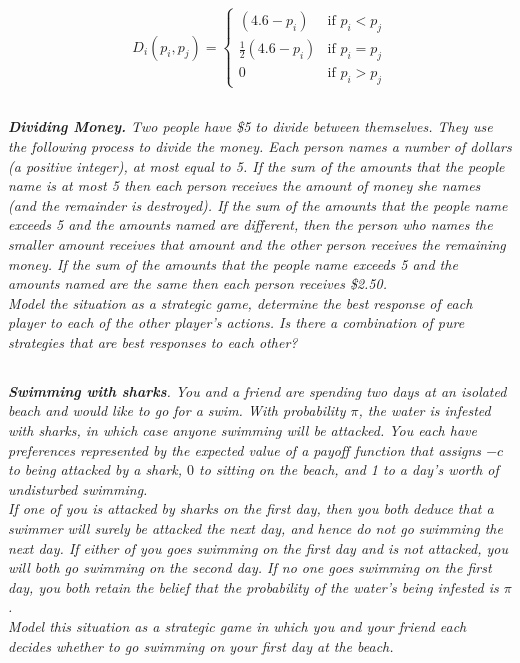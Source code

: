 \documentclass[12pt]{amsart}
\begin{document}
\[
D_i(p_i,p_j)= \begin{cases}
	(4.6-p_i) & \text{if }p_i<p_j \\
	\frac{1}{2}(4.6-p_i) & \text{if }p_i=p_j \\
	0 & \text{if }p_i>p_j
\end{cases}\]

\subsection{}
\textit{\textbf{Dividing Money.} Two people have \$5 to divide between themselves. They use the
following process to divide the money. Each person names a number of dollars (a positive
integer), at most equal to 5. If the sum of the amounts that the people name is at most 5
then each person receives the amount of money she names (and the remainder is
destroyed). If the sum of the amounts that the people name exceeds 5 and the amounts
named are different, then the person who names the smaller amount receives that amount
and the other person receives the remaining money. If the sum of the amounts that the
people name exceeds 5 and the amounts named are the same then each person receives
\$2.50. \\
Model the situation as a strategic game, determine the best response of each player to each
of the other player’s actions. Is there a combination of pure strategies that are best
responses to each other?}

\subsection{}
\textit{\textbf{Swimming with sharks}. You and a friend are spending two days at an isolated beach and
	would like to go for a swim. With probability $\pi$, the water is infested with sharks, in which
	case anyone swimming will be attacked. You each have preferences represented by the
	expected value of a payoff function that assigns $-c$ to being attacked by a shark, $0$ to sitting
	on the beach, and 1 to a day’s worth of undisturbed swimming. \\
	If one of you is attacked by sharks on the first day, then you both deduce that a swimmer
	will surely be attacked the next day, and hence do not go swimming the next day. If either
	of you goes swimming on the first day and is not attacked, you will both go swimming on
	the second day. If no one goes swimming on the first day, you both retain the belief that
	the probability of the water’s being infested is $\pi$. \\
	Model this situation as a strategic game in which you and your friend each decides whether
	to go swimming on your first day at the beach.}
\end{document}
